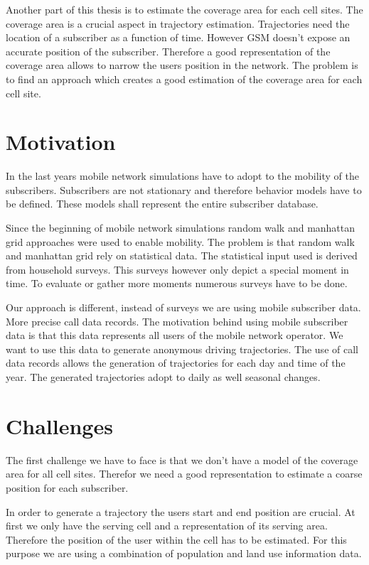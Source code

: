 \documentclass[master,english]{hgbthesis}
\begin{document}
Another part of this thesis is to estimate the coverage area for each cell sites. The coverage area is a crucial aspect in trajectory estimation. Trajectories need the location of a subscriber as a function of time. However GSM doesn't expose an accurate position of the subscriber. Therefore a good representation of the coverage area allows to narrow the users position in the network. The problem is to find an approach which creates a good estimation of the coverage area for each cell site.

\section{Motivation}

In the last years mobile network simulations have to adopt to the mobility of the subscribers. Subscribers are not stationary and therefore behavior models have to be defined. These models shall represent the entire subscriber database. 

Since the beginning of mobile network simulations random walk and manhattan grid approaches were used to enable mobility. The problem is that random walk and manhattan grid rely on statistical data. The statistical input used is derived from household surveys. This surveys however only depict a special moment in time. To evaluate or gather more moments numerous surveys have to be done. 

Our approach is different, instead of surveys we are using mobile subscriber data. More precise call data records. The motivation behind using mobile subscriber data is that this data represents all users of the mobile network operator. We want to use this data to generate anonymous driving trajectories. The use of call data records allows the generation of trajectories for each day and time of the year. The generated trajectories adopt to daily as well seasonal changes.

\section{Challenges}

The first challenge we have to face is that we don't have a model of the coverage area for all cell sites. Therefor we need a good representation to estimate a coarse position for each subscriber.

In order to generate a trajectory the users start and end position are crucial. At first we only have the serving cell and a representation of its serving area. Therefore the position of the user within the cell has to be estimated. For this purpose we are using a combination of population and land use information data.
\end{document}
